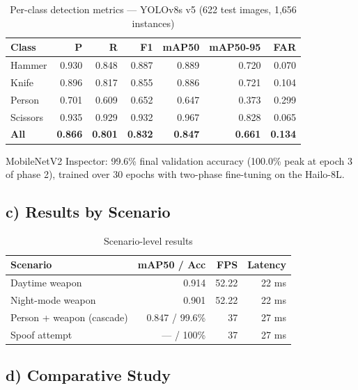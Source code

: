 \documentclass[12pt,a4paper]{article}
\begin{document}
\begin{table}[h]
\centering
\caption{Per-class detection metrics — YOLOv8s v5 (622 test images, 1{,}656 instances)}
\begin{tabular}{@{}lrrrrrr@{}}
\toprule
Class    & P     & R     & F1    & mAP50 & mAP50-95 & FAR   \\
\midrule
Hammer   & 0.930 & 0.848 & 0.887 & 0.889 & 0.720    & 0.070 \\
Knife    & 0.896 & 0.817 & 0.855 & 0.886 & 0.721    & 0.104 \\
Person   & 0.701 & 0.609 & 0.652 & 0.647 & 0.373    & 0.299 \\
Scissors & 0.935 & 0.929 & 0.932 & 0.967 & 0.828    & 0.065 \\
\midrule
\textbf{All} & \textbf{0.866} & \textbf{0.801} & \textbf{0.832} &
               \textbf{0.847} & \textbf{0.661} & \textbf{0.134} \\
\bottomrule
\end{tabular}
\end{table}

MobileNetV2 Inspector: 99.6\% final validation accuracy (100.0\% peak at epoch 3 of
phase 2), trained over 30 epochs with two-phase fine-tuning on the Hailo-8L.

\subsection*{c) Results by Scenario}

\begin{table}[h]
\centering
\caption{Scenario-level results}
\begin{tabular}{@{}lrrr@{}}
\toprule
Scenario               & mAP50 / Acc & FPS   & Latency \\
\midrule
Daytime weapon         & 0.914       & 52.22 & 22 ms   \\
Night-mode weapon      & 0.901       & 52.22 & 22 ms   \\
Person + weapon (cascade) & 0.847 / 99.6\% & 37 & 27 ms \\
Spoof attempt          & — / 100\%   & 37    & 27 ms   \\
\bottomrule
\end{tabular}
\end{table}

\subsection*{d) Comparative Study}
\end{document}
